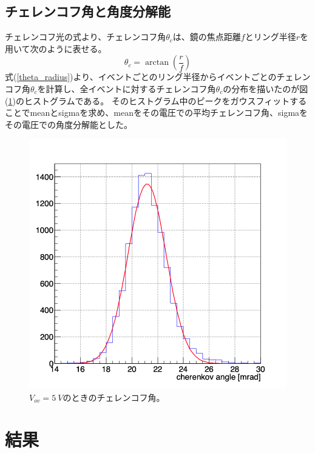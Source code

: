 \documentclass[uplatex, titlepage, dvipdfmx, 12pt, a4paper]{jsreport}
\begin{document}
    \section{チェレンコフ角と角度分解能}
    チェレンコフ光の式より、チェレンコフ角$\theta_{c}$は、鏡の焦点距離$f$とリング半径$r$を用いて次のように表せる。
    \begin{equation}
      \theta_{c} = \arctan \left(\frac{r}{f} \right)
      \label{theta_radius}
    \end{equation}
    式(\ref{theta_radius})より、イベントごとのリング半径からイベントごとのチェレンコフ角$\theta_{c}$を計算し、全イベントに対するチェレンコフ角$\theta_c$の分布を描いたのが図(\ref{fig:5Vangle})のヒストグラムである。
    そのヒストグラム中のピークをガウスフィットすることでmeanとsigmaを求め、meanをその電圧での平均チェレンコフ角、sigmaをその電圧での角度分解能とした。
    \begin{figure}[hbtp]
      \begin{center} 
        \includegraphics[scale=0.5, clip]{image/Vov5V_angle.png}
        \caption{$V_{ov}=\SI{5}{V}$のときのチェレンコフ角。} 
        \label{fig:5Vangle} 
      \end{center}
    \end{figure}
    
      

\chapter{結果}
\end{document}
